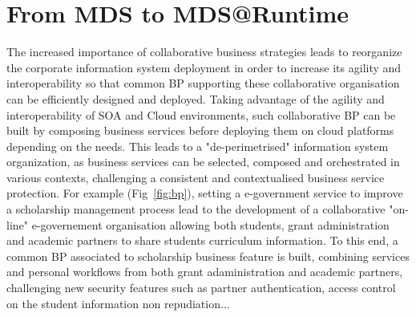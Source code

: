\documentclass[runningheads,a4paper]{llncs}
\begin{document}
\section{From MDS to MDS@Runtime}
\label{mdsToMds@Runtime}
The increased importance of collaborative business strategies leads to reorganize the corporate information system deployment in order to increase its agility and interoperability so that common BP supporting these collaborative organisation can be efficiently designed and deployed. Taking advantage of the agility and interoperability of SOA and Cloud environments, such collaborative BP can be built by composing business services before deploying them on cloud platforms depending on the needs. This leads to a "de-perimetrised" information system organization, as business services can be selected,  composed and orchestrated in various contexts, challenging a consistent and contextualised business service protection.
For example (Fig~\ref{fig:bp}), setting a e-government service to improve a scholarship management process lead to the development of a collaborative "on-line" e-governement organisation allowing both students, grant administration and academic partners to share students curriculum information. To this end, a common BP associated to scholarship business feature is built, combining services and personal workflows from both grant adaministration and academic partners, challenging new security features such as partner authentication, access control on the student information non repudiation...  
\end{document}
